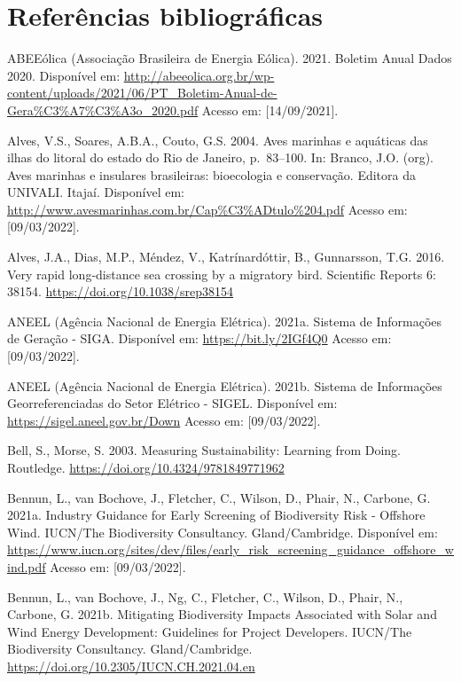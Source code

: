 \documentclass[
  oneside]{scrbook}
\begin{document}
\newpage

\hypertarget{referuxeancias-bibliogruxe1ficas-7}{%
\section{Referências bibliográficas}\label{referuxeancias-bibliogruxe1ficas-7}}

ABEEólica (Associação Brasileira de Energia Eólica). 2021. Boletim Anual Dados 2020. Disponível em: \url{http://abeeolica.org.br/wp-content/uploads/2021/06/PT_Boletim-Anual-de-Gera\%C3\%A7\%C3\%A3o_2020.pdf} Acesso em: {[}14/09/2021{]}.

Alves, V.S., Soares, A.B.A., Couto, G.S. 2004. Aves marinhas e aquáticas das ilhas do litoral do estado do Rio de Janeiro, p.~83--100. In: Branco, J.O. (org). Aves marinhas e insulares brasileiras: bioecologia e conservação. Editora da UNIVALI. Itajaí. Disponível em: \url{http://www.avesmarinhas.com.br/Cap\%C3\%ADtulo\%204.pdf} Acesso em: {[}09/03/2022{]}.

Alves, J.A., Dias, M.P., Méndez, V., Katrínardóttir, B., Gunnarsson, T.G. 2016. Very rapid long-distance sea crossing by a migratory bird. Scientific Reports 6: 38154. \url{https://doi.org/10.1038/srep38154}

ANEEL (Agência Nacional de Energia Elétrica). 2021a. Sistema de Informações de Geração - SIGA. Disponível em: \url{https://bit.ly/2IGf4Q0} Acesso em: {[}09/03/2022{]}.

ANEEL (Agência Nacional de Energia Elétrica). 2021b. Sistema de Informações Georreferenciadas do Setor Elétrico - SIGEL. Disponível em: \url{https://sigel.aneel.gov.br/Down} Acesso em: {[}09/03/2022{]}.

Bell, S., Morse, S. 2003. Measuring Sustainability: Learning from Doing. Routledge. \url{https://doi.org/10.4324/9781849771962}

Bennun, L., van Bochove, J., Fletcher, C., Wilson, D., Phair, N., Carbone, G. 2021a. Industry Guidance for Early Screening of Biodiversity Risk - Offshore Wind. IUCN/The Biodiversity Consultancy. Gland/Cambridge. Disponível em: \url{https://www.iucn.org/sites/dev/files/early_risk_screening_guidance_offshore_wind.pdf} Acesso em: {[}09/03/2022{]}.

Bennun, L., van Bochove, J., Ng, C., Fletcher, C., Wilson, D., Phair, N., Carbone, G. 2021b. Mitigating Biodiversity Impacts Associated with Solar and Wind Energy Development: Guidelines for Project Developers. IUCN/The Biodiversity Consultancy. Gland/Cambridge. \url{https://doi.org/10.2305/IUCN.CH.2021.04.en}
\end{document}
